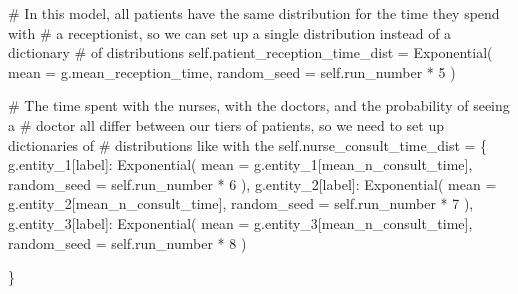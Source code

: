 \documentclass[
  letterpaper,
  DIV=11,
  numbers=noendperiod]{scrreprt}
\newenvironment{Shaded}{}{}
\newcommand{\CommentTok}[1]{\textcolor[rgb]{0.42,0.45,0.49}{#1}}
\newcommand{\DecValTok}[1]{\textcolor[rgb]{0.00,0.36,0.77}{#1}}
\newcommand{\NormalTok}[1]{\textcolor[rgb]{0.14,0.16,0.18}{#1}}
\newcommand{\OperatorTok}[1]{\textcolor[rgb]{0.14,0.16,0.18}{#1}}
\newcommand{\StringTok}[1]{\textcolor[rgb]{0.01,0.18,0.38}{#1}}
\newcommand{\VariableTok}[1]{\textcolor[rgb]{0.89,0.38,0.04}{#1}}
\newcommand*\circled[1]{\tikz[baseline=(char.base)]{
          \node[shape=circle,draw,inner sep=1pt] (char) {{\scriptsize#1}};}}
\begin{document}
\begin{tcolorbox}
\begin{Shaded}
\begin{Highlighting}[]
        \CommentTok{\# In this model, all patients have the same distribution for the time they spend with}
        \CommentTok{\# a receptionist, so we can set up a single distribution instead of a dictionary}
        \CommentTok{\# of distributions}
        \VariableTok{self}\NormalTok{.patient\_reception\_time\_dist }\OperatorTok{=}\NormalTok{ Exponential( }\hspace*{\fill}\NormalTok{\circled{7}}
\NormalTok{                mean }\OperatorTok{=}\NormalTok{ g.mean\_reception\_time,}
\NormalTok{                random\_seed }\OperatorTok{=} \VariableTok{self}\NormalTok{.run\_number }\OperatorTok{*} \DecValTok{5}
\NormalTok{                )}

        \CommentTok{\# The time spent with the nurses, with the doctors, and the probability of seeing a}
        \CommentTok{\# doctor all differ between our tiers of patients, so we need to set up dictionaries of}
        \CommentTok{\# distributions like with the}
        \VariableTok{self}\NormalTok{.nurse\_consult\_time\_dist }\OperatorTok{=}\NormalTok{ \{}
\NormalTok{            g.entity\_1[}\StringTok{\textquotesingle{}label\textquotesingle{}}\NormalTok{]: Exponential(}
\NormalTok{                mean }\OperatorTok{=}\NormalTok{ g.entity\_1[}\StringTok{\textquotesingle{}mean\_n\_consult\_time\textquotesingle{}}\NormalTok{],}
\NormalTok{                random\_seed }\OperatorTok{=} \VariableTok{self}\NormalTok{.run\_number }\OperatorTok{*} \DecValTok{6}
\NormalTok{                ),}
\NormalTok{            g.entity\_2[}\StringTok{\textquotesingle{}label\textquotesingle{}}\NormalTok{]: Exponential(}
\NormalTok{                mean }\OperatorTok{=}\NormalTok{ g.entity\_2[}\StringTok{\textquotesingle{}mean\_n\_consult\_time\textquotesingle{}}\NormalTok{],}
\NormalTok{                random\_seed }\OperatorTok{=} \VariableTok{self}\NormalTok{.run\_number }\OperatorTok{*} \DecValTok{7}
\NormalTok{                ),}
\NormalTok{            g.entity\_3[}\StringTok{\textquotesingle{}label\textquotesingle{}}\NormalTok{]: Exponential(}
\NormalTok{                mean }\OperatorTok{=}\NormalTok{ g.entity\_3[}\StringTok{\textquotesingle{}mean\_n\_consult\_time\textquotesingle{}}\NormalTok{],}
\NormalTok{                random\_seed }\OperatorTok{=} \VariableTok{self}\NormalTok{.run\_number }\OperatorTok{*} \DecValTok{8}
\NormalTok{                )}

\NormalTok{        \}}


\end{Highlighting}
\end{Shaded}
\end{tcolorbox}
\end{document}
